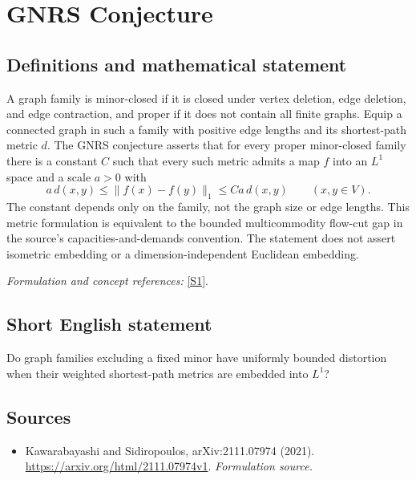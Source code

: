 \documentclass[11pt]{article}
\begin{document}
\section*{\texorpdfstring{GNRS Conjecture}{GNRS Conjecture}}\label{1404}
\subsection{Definitions and mathematical statement}
A graph family is minor-closed if it is closed under vertex deletion, edge deletion, and edge contraction, and proper if it does not contain all finite graphs. Equip a connected graph in such a family with positive edge lengths and its shortest-path metric $d$. The GNRS conjecture asserts that for every proper minor-closed family there is a constant $C$ such that every such metric admits a map $f$ into an $L^1$ space and a scale $a>0$ with
\[
 a\,d(x,y)\le\|f(x)-f(y)\|_1\le C a\,d(x,y)
 \qquad(x,y\in V).
\]
The constant depends only on the family, not the graph size or edge lengths. This metric formulation is equivalent to the bounded multicommodity flow-cut gap in the source's capacities-and-demands convention. The statement does not assert isometric embedding or a dimension-independent Euclidean embedding.
\par\smallskip\textit{Formulation and concept references:} \href{https://arxiv.org/html/2111.07974v1}{[S1]}.

\subsection{Short English statement}
Do graph families excluding a fixed minor have uniformly bounded distortion when their weighted shortest-path metrics are embedded into $L^1$?
\subsection{Sources}
\begin{itemize}
\item[S1]Kawarabayashi and Sidiropoulos, arXiv:2111.07974 (2021).
\url{https://arxiv.org/html/2111.07974v1}.
\textit{Formulation source.}
\end{itemize}
\end{document}
